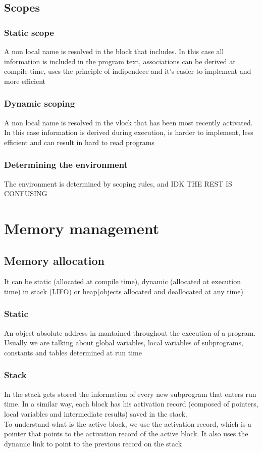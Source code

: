 \documentclass[12pt, a4paper]{article}
\begin{document}
\subsection{Scopes}
\subsubsection{Static scope}
A non local name is resolved in the block that includes. In this case all information is included in the program text,
associations can be derived at compile-time, uses the principle of indipendece and it's easier to implement and more 
efficient
\subsubsection{Dynamic scoping}
A non local name is resolved in the vlock that has been most recently activated. In this case information is derived 
during execution, is harder to implement, less efficient and can result in hard to read programs

\subsubsection{Determining the environment}
The environment is determined by scoping rules, and IDK THE REST IS CONFUSING

\newpage
\section{Memory management}
\subsection{Memory allocation}
It can be static (allocated at compile time), dynamic (allocated at execution time) in stack (LIFO) or heap(objects
allocated and deallocated at any time)

\subsubsection{Static}
An object absolute address in mantained throughout the execution of a program. Usually we are talking about global
variables, local variables of subprograms, constants and tables determined at run time

\subsubsection{Stack}
In the stack gets stored the information of every new subprogram that enters run time. In a similar way, each block
has his activation record (composed of pointers, local variables and intermediate results) saved in the stack.\\To 
understand what is the active block, we use the activation record, which is a pointer that points to the activation
record of the active block. It also uses the dynamic link to point to the previous record on the stack
\end{document}
